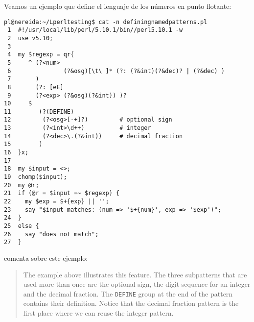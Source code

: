 Veamos un ejemplo que define el lenguaje de los números en punto flotante:
\begin{verbatim}
pl@nereida:~/Lperltesting$ cat -n definingnamedpatterns.pl
 1  #!/usr/local/lib/perl/5.10.1/bin//perl5.10.1 -w
 2  use v5.10;
 3
 4  my $regexp = qr{
 5     ^ (?<num>
 6               (?&osg)[\t\ ]* (?: (?&int)(?&dec)? | (?&dec) )
 7       )
 8       (?: [eE]
 9       (?<exp> (?&osg)(?&int)) )?
10     $
11        (?(DEFINE)
12         (?<osg>[-+]?)         # optional sign
13         (?<int>\d++)          # integer
14         (?<dec>\.(?&int))     # decimal fraction
15        )
16  }x;
17
18  my $input = <>;
19  chomp($input);
20  my @r;
21  if (@r = $input =~ $regexp) {
22    my $exp = $+{exp} || '';
23    say "$input matches: (num => '$+{num}', exp => '$exp')";
24  }
25  else {
26    say "does not match";
27  }
\end{verbatim}
 comenta sobre este ejemplo:
\begin{it}
\begin{quotation}
The example above illustrates this feature.
The three subpatterns that
are used more than once are the optional sign, 
the digit sequence for
an integer 
and the decimal fraction. The \verb|DEFINE| 
group at the end of
the pattern contains their definition. Notice that the decimal fraction
pattern is the first place where we can reuse the integer pattern.
\end{quotation}
\end{it}



